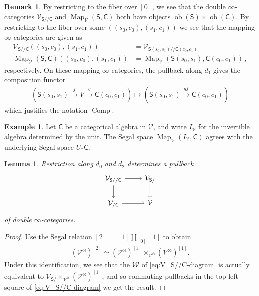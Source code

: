 \documentclass[10pt]{amsart}
\numberwithin{equation}{section}
\newtheorem{lem}[prop]{Lemma}
\theoremstyle{definition}
\newtheorem{ex}[prop]{Example}
\newtheorem{rem}[prop]{Remark}
\DeclareMathOperator{\Map}{Map}
\DeclareMathOperator{\ob}{ob}
\DeclareMathOperator{\Comp}{Comp}
\newcommand{\cV}{\mathcal{V}}
\newcommand{\cW}{\mathcal{W}}
\newcommand{\sfC}{\mathsf{C}}
\newcommand{\sfS}{\mathsf{S}}
\begin{document}
	\begin{rem}\label{rem:unwinding_double_slices}
		By restricting to the fiber over $[0]$, we see that the double $\infty$-categories $\cV_{\sfS/ /\sfC}$ and $\Map_{\cV}(\sfS, \sfC)$ both have objects $\ob(\sfS) \times \ob(\sfC)$.
		By restricting to the fiber over some $\left( (s_0,c_0), (s_1,c_1) \right)$ we see that the mapping $\infty$-categories are given as
		\begin{align*}
			\cV_{\sfS/ /\sfC}\left( (s_0,c_0), (s_1, c_1) \right) &= \cV_{\sfS(s_0,s_1)/ / \sfC(c_0,c_1)} \\
			\Map_{\cV}(\sfS,\sfC)\left( (s_0,c_0), (s_1, c_1) \right) &= \Map_{\cV}\left(\sfS(s_0,s_1), \sfC(c_0,c_1) \right) \,,
		\end{align*}
		respectively.
		On these mapping $\infty$-categories, the pullback along $d_1$ gives the composition functor
		\begin{align*}
			\left( \sfS(s_0, s_1) \xrightarrow{f} V \xrightarrow{g} \sfC(c_0,c_1) \right) \mapsto \left(  \sfS(s_0,s_1) \xrightarrow{gf} \sfC(c_0,c_1) \right)
		\end{align*}
		which justifies the notation $\Comp$.
	\end{rem}

	\begin{ex}\label{ex:underlying_from_slice}
		Let $\sfC$ be a categorical algebra in $\cV$, and write $I_{\cV}$ for the invertible algebra determined by the unit. The Segal space $\Map_{\cV}(I_{\cV}, \sfC)$ agrees with the underlying Segal space $U_{*}\sfC$.
	\end{ex}

	\begin{lem}\label{lem:double_slice_pullback}
		Restriction along $d_0$ and $d_2$ determines a pullback
		\begin{equation*}
			\begin{tikzcd}
				\cV_{\sfS / /\sfC} \arrow[r] \arrow[d] & \cV_{\sfS/} \arrow[d] \\
				\cV_{/ \sfC}  \arrow[r]&  \cV
			\end{tikzcd}
		\end{equation*}
     of double $\infty$-categories.
	\end{lem}

	\begin{proof}
		Use the Segal relation $[2] = [1]\coprod_{[0]}[1]$ to obtain
		\begin{align*}
			\left(\cV^{\otimes} \right)^{[2]} \simeq \left(\cV^{\otimes} \right)^{[1]} \times_{\cV^{\otimes}} \left(\cV^{\otimes} \right)^{[1]}.
		\end{align*}
		Under this identification, we see that the $\cW$ of \eqref{eq:V_S//C-diagram} is actually equivalent to $\cV_{\sfS/} \times_{\cV^{\otimes}} \left(\cV^{\otimes}\right)^{[1]}$, and so commuting pullbacks in the top left square of \eqref{eq:V_S//C-diagram} we get the result.
	\end{proof}
\end{document}
